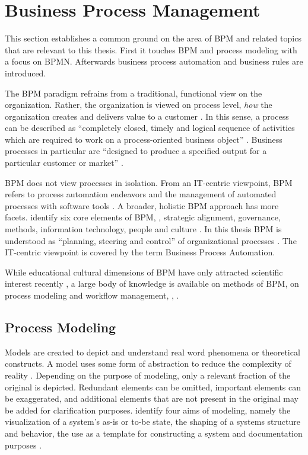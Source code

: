 \section{Business Process Management}

This section establishes a common ground on the area of \ac{BPM} and related topics that are relevant to this thesis. First it touches \ac{BPM} and process modeling with a focus on \ac{BPMN}. Afterwards business process automation and business rules are introduced.

The \ac{BPM} paradigm refrains from a traditional, functional view on the organization. Rather, the organization is viewed on process level, \ie \textit{how} the organization creates and delivers value to a customer \citep[]{Davenport1993}. In this sense, a process can be described as \enquote{completely closed, timely and logical sequence of activities which are required to work on a process-oriented business object} \citep[]{Becker2003}. Business processes in particular are \enquote{designed to produce a specified output for a particular customer or market} \citep[]{Davenport1993}.

\ac{BPM} does not view processes in isolation. From an IT-centric viewpoint, \ac{BPM} refers to process automation endeavors and the management of automated processes with software tools \citep[]{Harmon2003}.  A broader, holistic \ac{BPM} approach has more facets. \cite{Rosemann2005} identify six core elements of \ac{BPM}, \viz, strategic alignment, governance, methods, information technology, people and culture \citep[see also][]{Rosemann2015}. In this thesis \ac{BPM} is understood as \enquote{planning, steering and control} of organizational processes \citep[]{Becker2003}. The IT-centric viewpoint is covered by the term Business Process Automation.

While educational \resp cultural dimensions of \ac{BPM} have only attracted scientific interest recently  \citep[]{VomBrocke2014a}, a large body of knowledge is available on methods of \ac{BPM}, \esp on process modeling and workflow management, \eg, \cite{Becker2011,Dumas2013,VomBrocke2015,VanderAalst2000}.

\subsection{Process Modeling}

Models are created to depict and understand real word phenomena or theoretical constructs. A model uses some form of abstraction to reduce the complexity of reality \citep[][]{Booch1998}. Depending on the purpose of modeling, only a relevant fraction of the original is depicted. Redundant elements can be omitted, important elements can be exaggerated, and additional elements that are not present in the original may be added for clarification purposes. \cite{Booch1998} identify four aims of modeling, namely the visualization of a system's as-is or to-be state, the shaping of a systems structure and behavior, the use as a template for constructing a system and documentation purposes \citep[]{Booch1998}.

